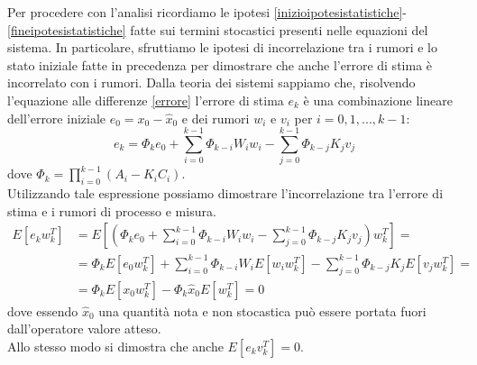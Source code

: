 
Per procedere con l'analisi ricordiamo le ipotesi \eqref{inizioipotesistatistiche}-\eqref{fineipotesistatistiche} fatte sui termini stocastici presenti nelle equazioni del sistema.
In particolare, sfruttiamo le ipotesi di incorrelazione tra i rumori e lo stato iniziale fatte in precedenza per dimostrare che anche l'errore di stima è incorrelato con i rumori.
Dalla teoria dei sistemi sappiamo che, risolvendo l'equazione alle differenze \eqref{errore} l'errore di stima $e_k$ è una combinazione lineare dell'errore iniziale $e_0=x_0-\hat{x}_0$ e dei rumori $w_i$ e $v_i$ per $i=0,1,...,k-1$:
\begin{equation}
e_k=\Phi_{k}e_0 + \sum_{i=0}^{k-1}\Phi_{k-i}W_iw_i - \sum_{j=0}^{k-1}\Phi_{k-j}K_jv_j
\end{equation}
dove $\Phi_{k}=\prod_{i=0}^{k-1}(A_i-K_iC_i)$.\\
Utilizzando tale espressione possiamo dimostrare l'incorrelazione tra l'errore di stima e i rumori di processo e misura.
\begin{equation}
\begin{split}
E[e_kw_k^T]&=E[(\Phi_{k}e_0 + \sum_{i=0}^{k-1}\Phi_{k-i}W_iw_i - \sum_{j=0}^{k-1}\Phi_{k-j}K_jv_j)w_k^T]=\\
&=\Phi_kE[e_0w_k^T] + \sum_{i=0}^{k-1}\Phi_{k-i}W_iE[w_iw_k^T] - \sum_{j=0}^{k-1}\Phi_{k-j}K_jE[v_jw_k^T]=\\
&=\Phi_kE[x_0w_k^T] - \Phi_k\hat{x}_0E[w_k^T] = 0
\end{split}
\end{equation}
dove essendo $\hat{x}_0$ una quantità nota e non stocastica può essere portata fuori dall'operatore valore atteso.\\
Allo stesso modo si dimostra che anche $E[e_kv_k^T]=0$.
\newpage